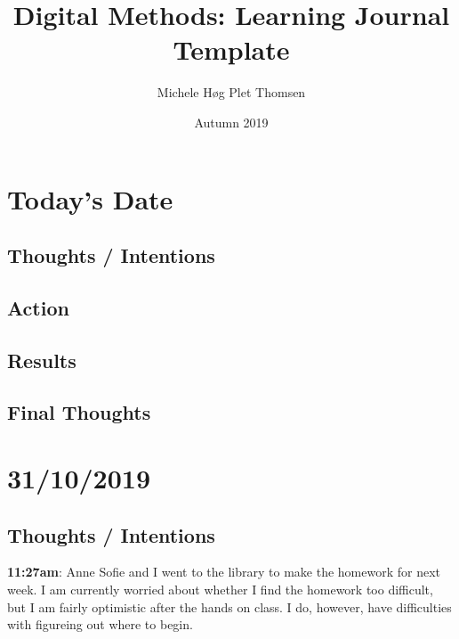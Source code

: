 \documentclass{article}
\title{Digital Methods: Learning Journal Template}
\author{Michele Høg Plet Thomsen}
\date{Autumn 2019}
\begin{document}
\maketitle

\section{Today's Date}
\subsection{Thoughts / Intentions}
\subsection{Action}
\subsection{Results}
\subsection{Final Thoughts}

\pagebreak{}

\section{31/10/2019}
\subsection{Thoughts / Intentions}

\textbf{11:27am}: Anne Sofie and I went to the library to make the homework for next week. I am currently worried about whether I find the homework too difficult, but I am fairly optimistic after the hands on class. I do, however, have difficulties with figureing out where to begin. 
\end{document}
